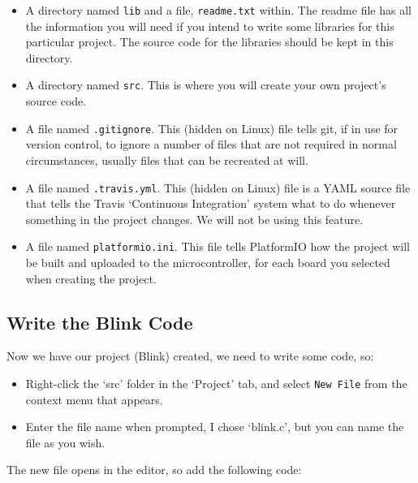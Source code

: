 \begin{itemize}
\tightlist
\item
  A directory named \lstinline!lib! and a file, \lstinline!readme.txt! within.
  The readme file has all the information you will need if you intend to
  write some libraries for this particular project. The source code for
  the libraries should be kept in this directory.
\item
  A directory named \lstinline!src!. This is where you will create your own
  project's source code.
\item
  A file named \lstinline!.gitignore!. This (hidden on Linux) file tells git, if in use for
  version control, to ignore a number of files that are not required in
  normal circumstances, usually files that can be recreated at will.
\item
  A file named \lstinline!.travis.yml!. This (hidden on Linux) file is a YAML source file that
  tells the Travis `Continuous Integration' system what to do whenever
  something in the project changes. We will not be using this feature.
\item
  A file named \lstinline!platformio.ini!. This file tells PlatformIO how the
  project will be built and uploaded to the microcontroller, for each
  board you selected when creating the project.
\end{itemize}

\subsection{Write the Blink Code}\label{write-the-blink-code}

Now we have our project (Blink) created, we need to write some code, so:

\begin{itemize}
\tightlist
\item
  Right-click the `src' folder in the `Project' tab, and select
  \lstinline!New File! from the context menu that appears.
\item
  Enter the file name when prompted, I chose `blink.c', but you can name
  the file as you wish.
\end{itemize}

The new file opens in the editor, so add the following code:

